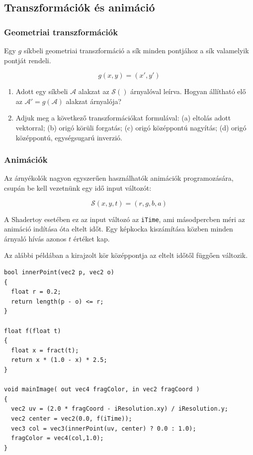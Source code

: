 \subsection{Transzformációk és animáció}

\subsubsection{Geometriai transzformációk}

Egy $g$ síkbeli geometriai transzformáció a sík minden pontjához a sík valamelyik pontját rendeli.

$$g(x, y) = (x', y')$$

\matfeladatok

\begin{enumerate}
  \item Adott egy síkbeli $\mathcal{A}$ alakzat az $\mathcal{S}()$ árnyalóval leírva. Hogyan állítható elő
  az $\mathcal{A}' = g(\mathcal{A})$ alakzat árnyalója?
  \item Adjuk meg a következő transzformációkat formulával:
  (a) eltolás adott vektorral;
  (b) origó körüli forgatás;
  (c) origó középpontú nagyítás;
  (d) origó középpontú, egységsugarú inverzió.
\end{enumerate}

\subsubsection{Animációk}
Az árnyékolók nagyon egyszerűen használhatók animációk programozására, csupán
be kell vezetnünk egy idő input változót:

$$\mathcal{S}(x, y, t) = (r, g, b, a)$$

A Shadertoy esetében ez az input változó az \texttt{iTime}, ami másodpercben méri az animáció indítása
óta eltelt időt. Egy képkocka kiszámítása közben minden árnyaló hívás azonos $t$ értéket kap.

Az alábbi példában a kirajzolt kör középpontja
az eltelt időtől függően változik.

\begin{tcolorbox}[colback=yellow!5,colframe=yellow!50!black,title=Változó sugarú és középpontú kör]
\begin{verbatim}
bool innerPoint(vec2 p, vec2 o)
{
  float r = 0.2;
  return length(p - o) <= r;
}
  
float f(float t)
{
  float x = fract(t);
  return x * (1.0 - x) * 2.5;
}
  
void mainImage( out vec4 fragColor, in vec2 fragCoord )
{
  vec2 uv = (2.0 * fragCoord - iResolution.xy) / iResolution.y;
  vec2 center = vec2(0.0, f(iTime));
  vec3 col = vec3(innerPoint(uv, center) ? 0.0 : 1.0);
  fragColor = vec4(col,1.0);
}
\end{verbatim}  
\end{tcolorbox}

